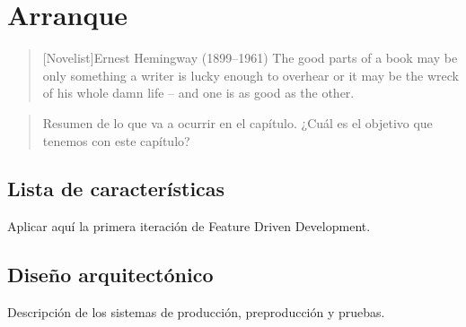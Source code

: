 \chapter{Arranque}

\begin{quotation}[Novelist]{Ernest Hemingway (1899--1961)}
The good parts of a book may be only something a writer is lucky enough to overhear or it may be the wreck of his whole damn life -- and one is as good as the other.
\end{quotation}

\begin{abstract}
Resumen de lo que va a ocurrir en el capítulo. ¿Cuál es el objetivo que tenemos con este capítulo?
\end{abstract}

\section{Lista de características}

Aplicar aquí la primera iteración de Feature Driven Development.

\section{Diseño arquitectónico}
\label{sec:arquitectura}
Descripción de los sistemas de producción, preproducción y pruebas.
